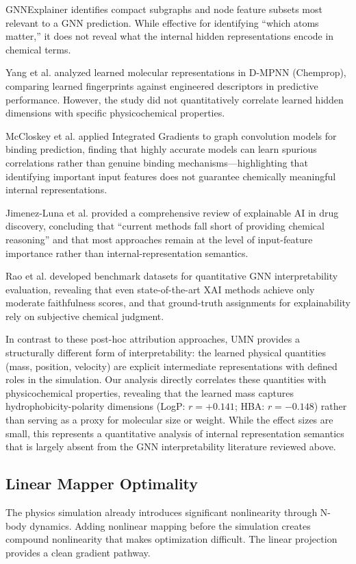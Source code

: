 \documentclass[11pt,a4paper]{article}
\begin{document}
GNNExplainer \cite{ying2019} identifies compact subgraphs and node feature subsets most relevant to a GNN prediction. While effective for identifying ``which atoms matter,'' it does not reveal what the internal hidden representations encode in chemical terms.

Yang et al. \cite{yang2019} analyzed learned molecular representations in D-MPNN (Chemprop), comparing learned fingerprints against engineered descriptors in predictive performance. However, the study did not quantitatively correlate learned hidden dimensions with specific physicochemical properties.

McCloskey et al. \cite{mccloskey2019} applied Integrated Gradients to graph convolution models for binding prediction, finding that highly accurate models can learn spurious correlations rather than genuine binding mechanisms---highlighting that identifying important input features does not guarantee chemically meaningful internal representations.

Jimenez-Luna et al. \cite{jimenezluna2020} provided a comprehensive review of explainable AI in drug discovery, concluding that ``current methods fall short of providing chemical reasoning'' and that most approaches remain at the level of input-feature importance rather than internal-representation semantics.

Rao et al. \cite{rao2022} developed benchmark datasets for quantitative GNN interpretability evaluation, revealing that even state-of-the-art XAI methods achieve only moderate faithfulness scores, and that ground-truth assignments for explainability rely on subjective chemical judgment.

In contrast to these post-hoc attribution approaches, UMN provides a structurally different form of interpretability: the learned physical quantities (mass, position, velocity) are explicit intermediate representations with defined roles in the simulation. Our analysis directly correlates these quantities with physicochemical properties, revealing that the learned mass captures hydrophobicity-polarity dimensions (LogP: $r = +0.141$; HBA: $r = -0.148$) rather than serving as a proxy for molecular size or weight. While the effect sizes are small, this represents a quantitative analysis of internal representation semantics that is largely absent from the GNN interpretability literature reviewed above.

\subsection{Linear Mapper Optimality}
The physics simulation already introduces significant nonlinearity through N-body dynamics. Adding nonlinear mapping before the simulation creates compound nonlinearity that makes optimization difficult. The linear projection provides a clean gradient pathway.
\end{document}
